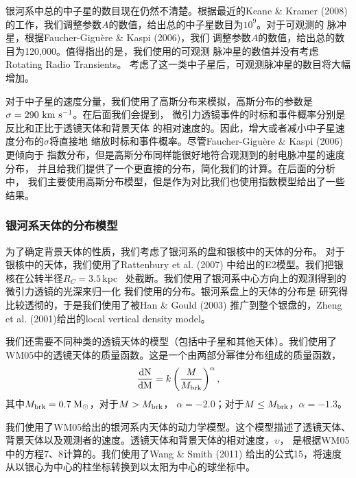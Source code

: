 银河系中总的中子星的数目现在仍然不清楚。根据最近的Keane \& Kramer (2008)\supercite{Keane}
的工作，我们调整参数$A$的数值，给出总的中子星数目为$10^9$。对于可观测的
脉冲星，根据Faucher-Gigu{\`e}re \& Kaspi (2006)\supercite{Faucher}，我们
调整参数$A$的数值，给出总的数目为120,000。值得指出的是，我们使用的可观测
脉冲星的数值并没有考虑Rotating Radio Transients\supercite{McLaughlin06}。
考虑了这一类中子星后，可观测脉冲星的数目将大幅增加\supercite{Keane}。

对于中子星的速度分量，我们使用了高斯分布来模拟，高斯分布的参数是
$\sigma=290\ \rm{km\ s^{-1}}$\supercite{Faucher}。在后面我们会提到，
微引力透镜事件的时标和事件概率分别是反比和正比于透镜天体和背景天体
的相对速度的。因此，增大或者减小中子星速度分布的$\sigma$将直接地
缩放时标和事件概率。尽管Faucher-Gigu{\`e}re \& Kaspi (2006)更倾向于
指数分布，但是高斯分布同样能很好地符合观测到的射电脉冲星的速度分布\supercite{hobbs}，
并且给我们提供了一个更直接的分布，简化我们的计算。在后面的分析中，
我们主要使用高斯分布模型，但是作为对比我们也使用指数模型给出了一些
结果。

\subsubsection{银河系天体的分布模型}

为了确定背景天体的性质，我们考虑了银河系的盘和银核中的天体的分布。
对于银核中的天体，我们使用了Rattenbury et al. (2007)\supercite{Rattenbury}
中给出的E2模型。我们把银核在公转半径$R_{C}=3.5$\,kpc~\supercite{Bissantz}
处截断。我们使用了银河系中心方向上的观测得到的微引力透镜的光深来归一化
我们使用的分布\supercite{Calchi,popowski}。银河系盘上的天体的分布是
研究得比较透彻的，于是我们使用了被Han \& Gould (2003)\supercite{han}
推广到整个银盘的，Zheng et al. (2001)\supercite{zheng}给出的local vertical 
density model。

我们还需要不同种类的透镜天体的模型（包括中子星和其他天体）。我们使用了
WM05中的透镜天体的质量函数。这是一个由两部分幂律分布组成的质量函数，
%
\begin{equation}
\frac{\rm{d}N}{\rm{d}M}=k\left(\frac{M}{M_{\rm{brk}}}\right)^{\rm{\alpha}},
\end{equation}
%
其中$M_{\rm{brk}}=0.7$\,$\rm{M_{\odot}}$，对于$M>M_{\rm{brk}}$，
$\alpha=-2.0$；对于$M\leq M_{\rm{brk}}$，$\alpha=-1.3$。

我们使用了WM05给出的银河系内天体的动力学模型。这个模型描述了透镜天体、
背景天体以及观测者的速度。透镜天体和背景天体的相对速度，$\upsilon$，
是根据WM05中的方程7、8计算的。我们使用了Wang \& Smith (2011)\supercite{wang}
给出的公式15，将速度从以银心为中心的柱坐标转换到以太阳为中心的球坐标中。

